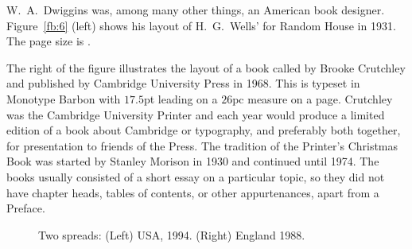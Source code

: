 \documentclass[10pt,a4paper,oneside,extrafontsizes]{memoir}%
\begin{document}
\begin{paracol}{2}
\switchEng
    W.~A.~Dwiggins was, among many other things, an American book designer.
Figure~\ref{fb:6} (left) shows his layout of H.~G.~Wells'  for Random House in 1931. The page size is .

The right of the figure illustrates the layout of a book called 
by Brooke Crutchley 
and published by Cambridge University 
Press in 1968. This is typeset in 
Monotype Barbon
with $17.5$pt leading on a $26$pc measure on a  page.
Crutchley was the Cambridge University 
Printer and each year would produce
a limited edition of a book about Cambridge or typography, and preferably
both together, for presentation to friends of the Press. The tradition of
the Printer's Christmas Book 
was started by Stanley 
Morison 
in 1930 and continued until 1974. The books usually consisted of a short 
essay on a
particular topic, so they did not have chapter heads, tables of contents,
or other appurtenances, apart from a Preface.
\end{paracol}


\begin{figure}
\centering
\begin{minipage}[b]{\pwlayi}
\end{minipage}
\hfill
\begin{minipage}[b]{\pwlayi}
\end{minipage}
\caption[Two spreads: USA, 1994 and England, 1988]%
        {Two spreads: (Left) USA, 1994.
         (Right) England 1988.} \label{fb:7}
\end{figure}

\enlargethispage{\baselineskip}
\end{document}
